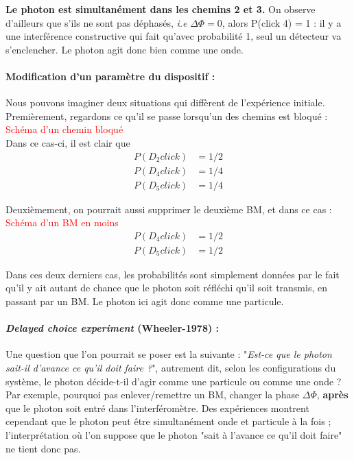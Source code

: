 \documentclass[../notesdecours.tex]{subfiles}
\begin{document}
\textbf{Le photon est simultanément dans les chemins 2 et 3.} On observe d'ailleurs que s'ils ne sont pas déphasés, \textit{i.e} $\Delta \Phi = 0$, alors P(click 4) = 1 : il y a une interférence constructive qui fait qu'avec probabilité 1, seul un détecteur va s'enclencher. Le photon agit donc bien comme une onde. \\

\paragraph{Modification d'un paramètre du dispositif :} Nous pouvons imaginer deux situations qui diffèrent de l'expérience initiale. \\

Premièrement, regardons ce qu'il se passe lorsqu'un des chemins est bloqué : \textcolor{red}{Schéma d'un chemin bloqué} \\
Dans ce cas-ci, il est clair que 
\begin{align*}
    P(D_2 click) &= 1/2 \\
    P(D_4 click) &= 1/4 \\
    P(D_5 click) &= 1/4
\end{align*}

Deuxièmement, on pourrait aussi supprimer le deuxième BM, et dans ce cas : \textcolor{red}{Schéma d'un BM en moins}
\begin{align*}
    P(D_4 click) &= 1/2 \\
    P(D_5 click) &= 1/2
\end{align*}

Dans ces deux derniers cas, les probabilités sont simplement données par le fait qu'il y ait autant de chance que le photon soit réfléchi qu'il soit transmis, en passant par un BM. Le photon ici agit donc comme une particule. 

\paragraph{\textit{Delayed choice experiment} (Wheeler-1978) :} Une question que l'on pourrait se poser est la suivante : "\textit{Est-ce que le photon sait-il d'avance ce qu'il doit faire ?}", autrement dit, selon les configurations du système, le photon décide-t-il d'agir comme une particule ou comme une onde ? \\
Par exemple, pourquoi pas enlever/remettre un BM, changer la phase $\Delta \Phi$, \textbf{après} que le photon soit entré dans l'interféromètre. Des expériences montrent cependant que le photon peut être simultanément onde et particule à la fois ; l'interprétation où l'on suppose que le photon "sait à l'avance ce qu'il doit faire" ne tient donc pas. 
\end{document}
